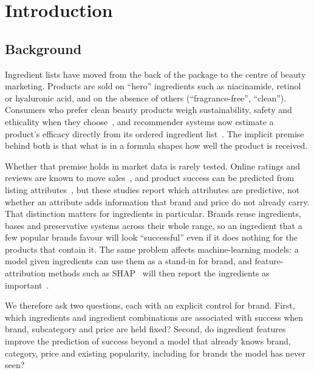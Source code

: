 \documentclass[11pt,a4paper]{article}
\newcommand{\draft}[1]{{\color{blue!70!black}#1}}
\begin{document}
\section{Introduction}

\subsection{Background}
\draft{Ingredient lists have moved from the back of the package to the centre of beauty marketing. Products are sold on ``hero'' ingredients such as niacinamide, retinol or hyaluronic acid, and on the absence of others (``fragrance-free'', ``clean''). Consumers who prefer clean beauty products weigh sustainability, safety and ethicality when they choose~\cite{shim2024}, and recommender systems now estimate a product's efficacy directly from its ordered ingredient list~\cite{lee2024}. The implicit premise behind both is that what is in a formula shapes how well the product is received.

Whether that premise holds in market data is rarely tested. Online ratings and reviews are known to move sales~\cite{chevalier2006,babic2016,moen2017}, and product success can be predicted from listing attributes~\cite{aulya2025,sari2026}, but these studies report which attributes are predictive, not whether an attribute adds information that brand and price do not already carry. That distinction matters for ingredients in particular. Brands reuse ingredients, bases and preservative systems across their whole range, so an ingredient that a few popular brands favour will look ``successful'' even if it does nothing for the products that contain it. The same problem affects machine-learning models: a model given ingredients can use them as a stand-in for brand, and feature-attribution methods such as SHAP~\cite{lundberg2017shap} will then report the ingredients as important~\cite{kumar2020,molnar2022}.

We therefore ask two questions, each with an explicit control for brand. First, which ingredients and ingredient combinations are associated with success when brand, subcategory and price are held fixed? Second, do ingredient features improve the prediction of success beyond a model that already knows brand, category, price and existing popularity, including for brands the model has never seen?}
\end{document}
